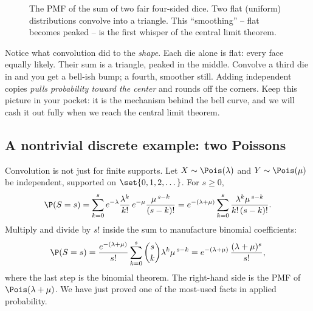 \begin{figure}[H]
\centering
{}
\caption{The PMF of the sum of two fair four-sided dice. Two flat
(uniform) distributions convolve into a triangle. This ``smoothing'' --
flat becomes peaked -- is the first whisper of the central limit theorem.}
\label{ch17:fig-dice}
\end{figure}

\begin{aestheticbox}
Notice what convolution did to the \emph{shape}. Each die alone is flat:
every face equally likely. Their sum is a triangle, peaked in the middle.
Convolve a third die in and you get a bell-ish bump; a fourth, smoother
still. Adding independent copies \emph{pulls probability toward the center}
and rounds off the corners. Keep this picture in your pocket: it is the
mechanism behind the bell curve, and we will cash it out fully when we
reach the central limit theorem.
\end{aestheticbox}

\subsection{A nontrivial discrete example: two Poissons}

Convolution is not just for finite supports. Let
$X \sim \Pois(\lambda)$ and $Y\sim\Pois(\mu)$ be independent, supported on
$\set{0,1,2,\dots}$. For $s\ge 0$,
\[
\P(S=s) = \sum_{k=0}^{s} e^{-\lambda}\frac{\lambda^k}{k!}\,
          e^{-\mu}\frac{\mu^{\,s-k}}{(s-k)!}
        = e^{-(\lambda+\mu)} \sum_{k=0}^{s} \frac{\lambda^k \mu^{\,s-k}}{k!\,(s-k)!}.
\]
Multiply and divide by $s!$ inside the sum to manufacture binomial
coefficients:
\[
\P(S=s) = \frac{e^{-(\lambda+\mu)}}{s!}
          \sum_{k=0}^{s} \binom{s}{k}\lambda^k \mu^{\,s-k}
        = e^{-(\lambda+\mu)}\,\frac{(\lambda+\mu)^s}{s!},
\]
where the last step is the binomial theorem. The right-hand side is the
PMF of $\Pois(\lambda+\mu)$. We have just proved one of the most-used
facts in applied probability.

